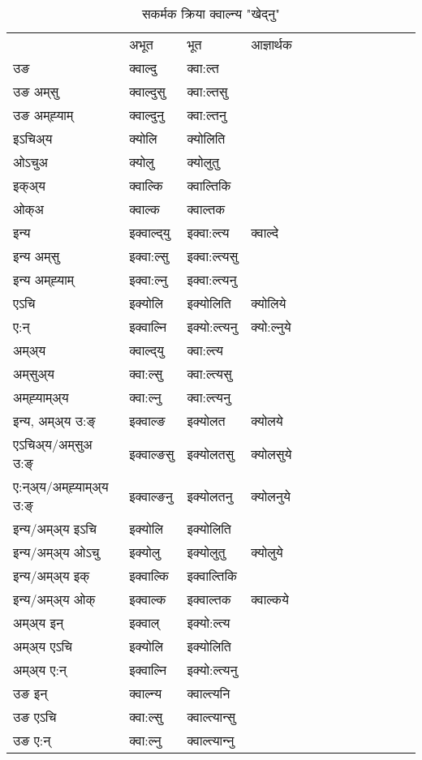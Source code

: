 \begin{table}[H]
\centering
\caption{\label{olt.vt} सकर्मक क्रिया  क्‍वाल्न्य  "खेद्‍नु"  }
\begin{tabular}{l|l|l|l|l|l|l|l|l|l|l|l|l}  \toprule
&अभूत & भूत & आज्ञार्थक \\ 
उङ &क्‍वाल्दु &क्‍वा:ल्त \\ 
उङ अम्‌सु&क्‍वाल्दुसु &क्‍वा:ल्तसु \\ 
उङ अम्‌ह्‍याम्&क्‍वाल्दुनु &क्‍वा:ल्तनु \\ 
इऽचिअ्य &क्योलि &क्योलिति   \\ 
ओऽचुअ        &क्योलु &क्योलुतु   \\ 
इक्अ्य&क्‍वाल्कि &क्‍वाल्तिकि   \\ 
ओक्अ &क्‍वाल्क &क्‍वाल्तक   \\ 
इन्य & इक्‍वाल्द्‌यु  & इक्‍वा:ल्त्य &क्‍वाल्दे  \\ 
इन्य अम्‌सु& इक्‍वा:ल्सु  & इक्‍वा:ल्त्यसु   \\ 
इन्य अम्‌ह्‍याम्& इक्‍वा:ल्नु  & इक्‍वा:ल्त्यनु   \\ 
एऽचि & इक्योलि & इक्योलिति &क्योलिये    \\ 
ए:न् & इक्‍वाल्नि  & इक्यो:ल्त्यनु &क्यो:ल्नुये  \\ 
अम्अ्य & क्‍वाल्द्‌यु  & क्‍वा:ल्त्य  \\ 
अम्‌सुअ्य & क्‍वा:ल्सु & क्‍वा:ल्त्यसु  \\ 
अम्‌ह्‍याम्अ्य & क्‍वा:ल्नु  & क्‍वा:ल्त्यनु \\ 
\midrule
इन्य, अम्अ्य उ:ङ्‌ &इक्‍वाल्ङ &इक्योलत &क्योलये \\ 
एऽचिअ्य/अम्‌सुअ उ:ङ्‌ &इक्‍वाल्ङसु &इक्योलतसु &क्योलसुये \\ 
ए:न्अ्य/अम्‌ह्‍याम्अ्य उ:ङ्‌ &इक्‍वाल्ङनु &इक्योलतनु &क्योलनुये \\ 
इन्य/अम्अ्य इऽचि &इक्योलि &इक्योलिति    \\ 
इन्य/अम्अ्य ओऽचु &इक्योलु &इक्योलुतु  &क्योलुये  \\ 
इन्य/अम्अ्य इक् &इक्‍वाल्कि &इक्‍वाल्तिकि   \\ 
इन्य/अम्अ्य ओक् &इक्‍वाल्क &इक्‍वाल्तक  &क्‍वाल्कये  \\ 
अम्अ्य इन् & इक्‍वाल् & इक्यो:ल्त्य   \\ 
अम्अ्य एऽचि & इक्योलि & इक्योलिति    \\ 
अम्अ्य ए:न् & इक्‍वाल्नि  & इक्यो:ल्त्यनु  \\ 
\midrule
उङ इन् & क्‍वाल्न्य  & क्‍वाल्त्यनि  \\ 
उङ एऽचि & क्‍वा:ल्सु  & क्‍वाल्त्यान्सु   \\ 
उङ ए:न्& क्‍वा:ल्नु  & क्‍वाल्त्यान्‍नु   \\ 
\bottomrule
\end{tabular}
\end{table}


